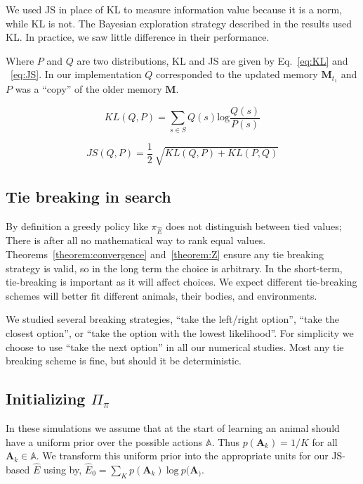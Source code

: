 We used JS in place of KL to measure information value because it is a norm, while KL is not. The Bayesian exploration strategy described in the results used KL. In practice, we saw little difference in their performance.

Where $P$ and $Q$ are two distributions, KL and JS are given by Eq.~\ref{eq:KL} and ~\ref{eq:JS}. In our implementation $Q$ corresponded to the updated memory $\mathbf{M}_{t_1}$ and $P$ was a “copy” of the older memory $\mathbf{M}$.

\begin{equation}
    \label{eq:KL}
    KL(Q, P) = \sum_{s \in S} Q(s) \text{log} \frac{Q(s)}{P(s)} 
\end{equation}

\begin{equation}
    \label{eq:JS}
    JS(Q, P) = \frac{1}{2} \ \sqrt{KL(Q, P) + KL(P, Q)}
\end{equation}

\subsection*{Tie breaking in search}
By definition a greedy policy like $\pi_{\hat E}$ does not distinguish between tied values; There is after all no mathematical way to rank equal values. Theorems~\ref{theorem:convergence} and~\ref{theorem:Z} ensure any tie breaking strategy is valid, so in the long term the choice is arbitrary. In the short-term, tie-breaking is important as it will affect choices. We expect different tie-breaking schemes will better fit different animals, their bodies, and environments. 

We studied several breaking strategies, ``take the left/right option'', ``take the closest option'', or ``take the option with the lowest likelihood''. For simplicity we choose to use ``take the next option'' in all our numerical studies. Most any tie breaking scheme is fine, but should it be deterministic.

\subsection*{Initializing $\Pi_\pi$}
In these simulations we assume that at the start of learning an animal should have a uniform prior over the possible actions $\mathbb{A}$. Thus $p(\mathbf{A}_k) = 1/K$ for all $\mathbf{A}_k \in \mathbb{A}$. We transform this uniform prior into the appropriate units for our JS-based $\hat E$ using by, $\hat E_0 = \sum_K p(\mathbf{A}_k)\ \text{log}\ p(\mathbf{A}_)$. 

